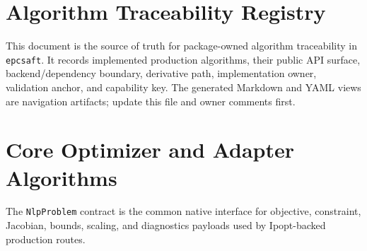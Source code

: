 \documentclass[12pt, letterpaper]{article}
\begin{document}
\section{Algorithm Traceability Registry}

This document is the source of truth for package-owned algorithm traceability in
\texttt{epcsaft}. It records implemented production algorithms, their public API
surface, backend/dependency boundary, derivative path, implementation owner,
validation anchor, and capability key. The generated Markdown and YAML views are
navigation artifacts; update this file and owner comments first.

\section{Core Optimizer and Adapter Algorithms}


The \texttt{NlpProblem} contract is the common native interface for objective,
constraint, Jacobian, bounds, scaling, and diagnostics payloads used by
Ipopt-backed production routes.

\end{document}
